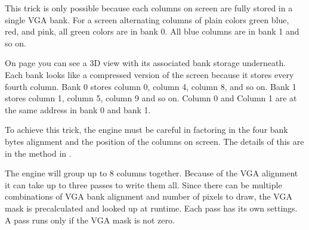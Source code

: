 This trick is only possible because each columns on screen are fully stored in a single VGA bank. For a screen alternating columns of plain colors green blue, red, and pink, all green colors are in bank 0. All blue columns are in bank 1 and so on.\\
\par
{}
 \par
  On page \pageref{vga_layout} you can see a 3D view with its associated bank storage underneath. Each bank looks like a compressed version of the screen because it stores every fourth column. Bank 0 stores column 0, column 4, column 8, and so on. Bank 1 stores column 1, column 5, column 9 and so on. Column 0 and Column 1 are at the same address in bank 0 and bank 1.\\
\par

  \begin{minipage}{\textwidth}
 

\centering
\vspace*{0.3cm}
\label{vga_layout}
\centering


 \end{minipage}

\par
\bigskip
To achieve this trick, the engine must be careful in factoring in the four bank bytes alignment and the position of the columns on screen. The details of this are in the method  in .\\
\par 
\begin{minipage}{\textwidth}

\end{minipage}
\par
The engine will group up to 8 columns together. Because of the VGA alignment it can take up to three passes to write them all. Since there can be multiple combinations of VGA bank alignment and number of pixels to draw, the VGA mask is precalculated and looked up at runtime. Each pass has its own settings. A pass runs only if the VGA mask is not zero.\\

